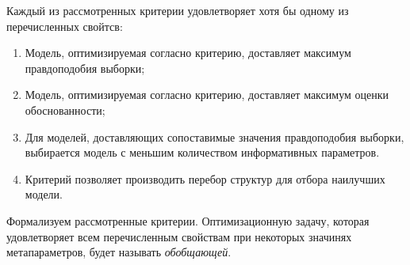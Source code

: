 Каждый из рассмотренных критерии удовлетворяет хотя бы одному из перечисленных свойтсв:
\begin{enumerate}
\item Модель, оптимизируемая согласно критерию, доставляет максимум правдоподобия выборки;
\item Модель, оптимизируемая согласно критерию, доставляет максимум оценки обоснованности;
\item Для моделей, доставляющих сопоставимые значения правдоподобия выборки, выбирается модель с меньшим количеством информативных параметров.
\item Критерий позволяет производить перебор структур для отбора наилучших модели.
\end{enumerate}

Формализуем рассмотренные критерии. Оптимизационную задачу, которая удовлетворяет всем перечисленным свойствам при некоторых значинях метапараметров, будет называть \textit{обобщающей}.

